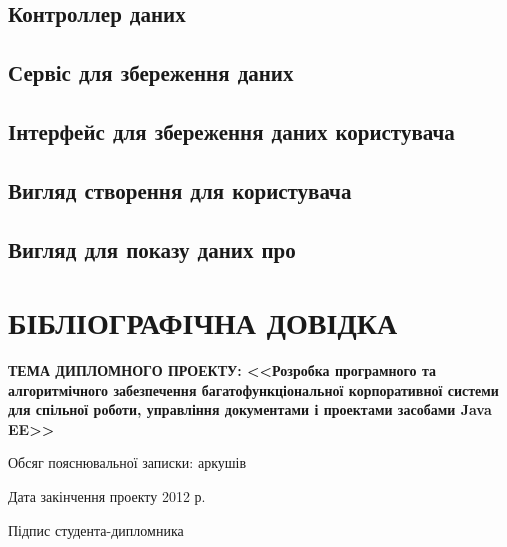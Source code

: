 \subsection*{Контроллер даних}


\subsection*{Сервіс для збереження даних}


\subsection*{Інтерфейс для збереження даних користувача}


\subsection*{Вигляд створення для користувача}


\subsection*{Вигляд для показу даних про}



\let\mycontinue\relax %

\section*{БІБЛІОГРАФІЧНА ДОВІДКА}
{\bf ТЕМА ДИПЛОМНОГО ПРОЕКТУ: <<Розробка програмного та алгоритмічного забезпечення багатофункціональної корпоративної системи для спільної роботи, управління документами і проектами засобами Java EE>>}
\vspace{30 mm}
\par Обсяг пояснювальної записки:\noindent\underline{} аркушів

\vspace{60 mm}

\par Дата закінчення проекту   \noindent\underline{} 2012 р.
\vspace{10 mm}
\par Підпис студента-дипломника \noindent\underline{\makebox[1.0in][c]{}}

